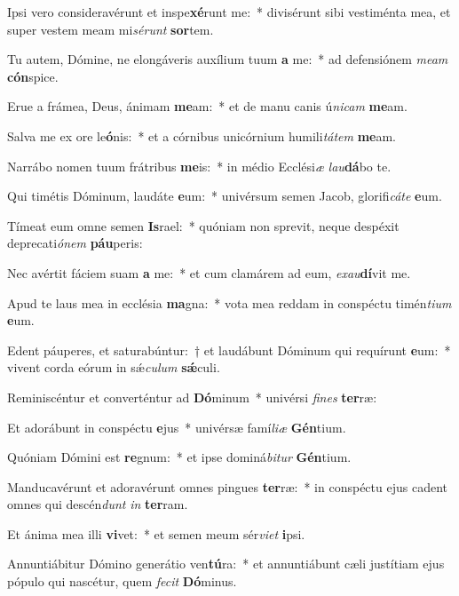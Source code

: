 \item Ipsi vero consideravérunt et inspe\textbf{xé}runt me:~* divisérunt sibi vestiménta mea, et super vestem meam mi\textit{sérunt} \textbf{sor}tem.
\item Tu autem, Dómine, ne elongáveris auxílium tuum \textbf{a} me:~* ad defensiónem \textit{meam} \textbf{cón}spice.
\item Erue a frámea, Deus, ánimam \textbf{me}am:~* et de manu canis ú\textit{nicam} \textbf{me}am.
\item Salva me ex ore le\textbf{ó}nis:~* et a córnibus unicórnium humili\textit{tátem} \textbf{me}am.
\item Narrábo nomen tuum frátribus \textbf{me}is:~* in médio Ecclési\textit{æ} \textit{lau}\textbf{dá}bo te.
\item Qui timétis Dóminum, laudáte \textbf{e}um:~* univérsum semen Jacob, glorifi\textit{cáte} \textbf{e}um.
\item Tímeat eum omne semen \textbf{Is}rael:~* quóniam non sprevit, neque despéxit deprecati\textit{ónem} \textbf{páu}peris:
\item Nec avértit fáciem suam \textbf{a} me:~* et cum clamárem ad eum, \textit{exau}\textbf{dí}vit me.
\item Apud te laus mea in ecclésia \textbf{ma}gna:~* vota mea reddam in conspéctu timén\textit{tium} \textbf{e}um.
\item Edent páuperes, et saturabúntur:~† et laudábunt Dóminum qui requírunt \textbf{e}um:~* vivent corda eórum in sǽ\textit{culum} \textbf{sǽ}culi.
\item Reminiscéntur et converténtur ad \textbf{Dó}minum~* univérsi \textit{fines} \textbf{ter}ræ:
\item Et adorábunt in conspéctu \textbf{e}jus~* univérsæ famí\textit{liæ} \textbf{Gén}tium.
\item Quóniam Dómini est \textbf{re}gnum:~* et ipse dominá\textit{bitur} \textbf{Gén}tium.
\item Manducavérunt et adoravérunt omnes pingues \textbf{ter}ræ:~* in conspéctu ejus cadent omnes qui descén\hspace{0.02em}\textit{dunt} \textit{in} \textbf{ter}ram.
\item Et ánima mea illi \textbf{vi}vet:~* et semen meum sér\textit{viet} \textbf{i}psi.
\item Annuntiábitur Dómino generátio ven\textbf{tú}ra:~* et annuntiábunt cæli justítiam ejus pópulo qui nascétur, quem \textit{fecit} \textbf{Dó}minus.
